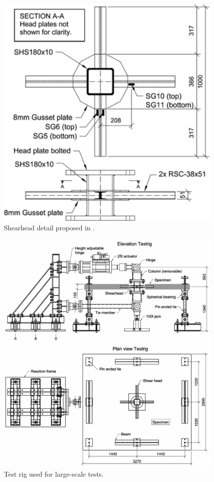 \begin{figure}\centering
    \includegraphics[width=\columnwidth]{Figures/e2011f4.pdf}
    \caption{Shearhead detail proposed in \cite{EDER20111164}.}
    \label{e2011f4}
    \end{figure}
\begin{figure}\centering
    \includegraphics[width=\columnwidth]{Figures/e2012f1.pdf}
    \caption{Test rig used for large-scale tests\citep{EDER2012239}.}
    \label{e2012f1}
    \end{figure}

